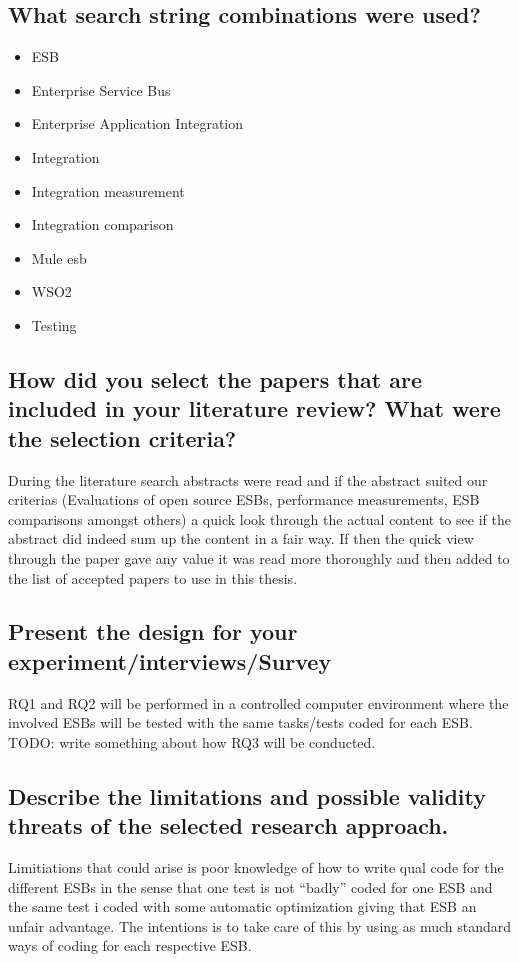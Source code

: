 \documentclass{llncs}
\begin{document}
\subsection{What search string combinations were used?}

\begin{itemize}
	\item ESB
	\item Enterprise Service Bus
	\item Enterprise Application Integration
	\item Integration
	\item Integration measurement
	\item Integration comparison
	\item Mule esb
	\item WSO2
	\item Testing
\end{itemize}

\subsection{How did you select the papers that are included in your literature review? What were the selection criteria?}
During the literature search abstracts were read and if the abstract suited our criterias (Evaluations of open source ESBs, performance measurements, ESB comparisons amongst others) a quick look through the actual content to see if the abstract did indeed sum up the content in a fair way. If then the quick view through the paper gave any value it was read more thoroughly and then added to the list of accepted papers to use in this thesis.

\subsection{Present the design for your experiment/interviews/Survey}
RQ1 and RQ2 will be performed in a controlled computer environment where the involved ESBs will be tested with the same tasks/tests coded for each ESB.
TODO: write something about how RQ3 will be conducted.

\subsection{Describe the limitations and possible validity threats of the selected research approach.}
Limitiations that could arise is poor knowledge of how to write qual code for the different ESBs in the sense that one test is not ``badly'' coded for one ESB and the same test i coded with some automatic optimization giving that ESB an unfair advantage. The intentions is to take care of this by using as much standard ways of coding for each respective ESB.
\end{document}
